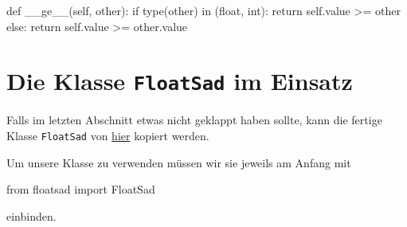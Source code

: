 \documentclass[
  a4paper,
  DIV=11]{scrreprt}
\newenvironment{Shaded}{\begin{snugshade}}{\end{snugshade}}
\newcommand{\BuiltInTok}[1]{\textcolor[rgb]{0.00,0.23,0.31}{#1}}
\newcommand{\ControlFlowTok}[1]{\textcolor[rgb]{0.00,0.23,0.31}{#1}}
\newcommand{\FunctionTok}[1]{\textcolor[rgb]{0.28,0.35,0.67}{#1}}
\newcommand{\ImportTok}[1]{\textcolor[rgb]{0.00,0.46,0.62}{#1}}
\newcommand{\KeywordTok}[1]{\textcolor[rgb]{0.00,0.23,0.31}{#1}}
\newcommand{\NormalTok}[1]{\textcolor[rgb]{0.00,0.23,0.31}{#1}}
\newcommand{\OperatorTok}[1]{\textcolor[rgb]{0.37,0.37,0.37}{#1}}
\newcommand{\VariableTok}[1]{\textcolor[rgb]{0.07,0.07,0.07}{#1}}
\theoremstyle{definition}
\theoremstyle{definition}
\theoremstyle{remark}
\begin{document}
\begin{Shaded}
\begin{Highlighting}[]
\KeywordTok{def} \FunctionTok{\_\_ge\_\_}\NormalTok{(}\VariableTok{self}\NormalTok{, other):}
    \ControlFlowTok{if} \BuiltInTok{type}\NormalTok{(other) }\KeywordTok{in}\NormalTok{ (}\BuiltInTok{float}\NormalTok{, }\BuiltInTok{int}\NormalTok{):}
        \ControlFlowTok{return} \VariableTok{self}\NormalTok{.value }\OperatorTok{\textgreater{}=}\NormalTok{ other}
    \ControlFlowTok{else}\NormalTok{:}
        \ControlFlowTok{return} \VariableTok{self}\NormalTok{.value }\OperatorTok{\textgreater{}=}\NormalTok{ other.value}
\end{Highlighting}
\end{Shaded}

\hypertarget{die-klasse-floatsad-im-einsatz}{%
\section{\texorpdfstring{Die Klasse \texttt{FloatSad} im
Einsatz}{Die Klasse FloatSad im Einsatz}}\label{die-klasse-floatsad-im-einsatz}}

Falls im letzten Abschnitt etwas nicht geklappt haben sollte, kann die
fertige Klasse \texttt{FloatSad} von \href{floatsad.py}{hier} kopiert
werden.

Um unsere Klasse zu verwenden müssen wir sie jeweils am Anfang mit

\begin{Shaded}
\begin{Highlighting}[]
\ImportTok{from}\NormalTok{ floatsad }\ImportTok{import}\NormalTok{ FloatSad}
\end{Highlighting}
\end{Shaded}

einbinden.
\end{document}
